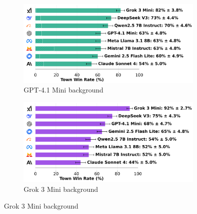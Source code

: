 \documentclass{article}
\begin{document}
\begin{figure}[htbp]
    \centering
    \begin{subfigure}[b]{0.48\textwidth}
        \centering
        \includegraphics[width=\textwidth]{../results/villager_gpt-4.1_mini_db_benchmark.png}
        \caption{GPT-4.1 Mini background}
        \label{fig:villager_gpt41mini_appendix}
    \end{subfigure}
    \hfill
    \begin{subfigure}[b]{0.48\textwidth}
        \centering
        \includegraphics[width=\textwidth]{../results/villager_grok_3_mini_db_benchmark.png}
        \caption{Grok 3 Mini background}
        \label{fig:villager_grok3_appendix}
    \end{subfigure}
    
    \vspace{0.5cm}
    

\end{figure}
\end{document}
